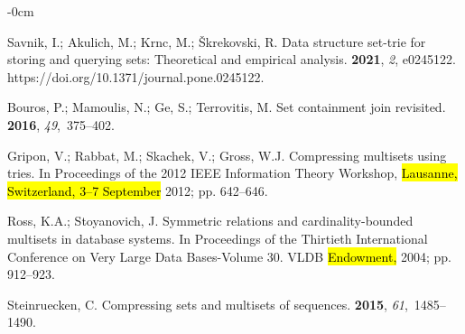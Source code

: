 \documentclass[algorithms,article,accept,pdftex,moreauthors]{Definitions/mdpi}
\begin{document}




\begin{adjustwidth}{-\extralength}{0cm}
\begin{thebibliography}{999}

Savnik, I.; Akulich, M.; Krnc, M.; Škrekovski, R.
\newblock Data structure set-trie for storing and querying sets: Theoretical
  and empirical analysis.
 {\bf 2021}, {\em 2}, e0245122. https://doi.org/10.1371/journal.pone.0245122.

Bouros, P.; Mamoulis, N.; Ge, S.; Terrovitis, M.
\newblock Set containment join revisited.
 {\bf 2016}, {\em
  49},~375--402.

Gripon, V.; Rabbat, M.; Skachek, V.; Gross, W.J.
\newblock Compressing multisets using tries.
\newblock In Proceedings of the 2012 IEEE Information Theory Workshop, \hl{Lausanne, Switzerland, 3--7 September} %
  2012; pp. 642--646.

Ross, K.A.; Stoyanovich, J.
\newblock Symmetric relations and cardinality-bounded multisets in database
  systems.
\newblock In Proceedings of the Thirtieth International
  Conference on Very Large Data Bases-Volume 30. VLDB \hl{Endowment,} %
  2004; pp.
  912--923.

Steinruecken, C.
\newblock Compressing sets and multisets of sequences.
 {\bf 2015}, {\em
  61},~1485--1490.


\end{thebibliography}
\end{adjustwidth}
\end{document}
